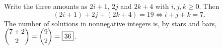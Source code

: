Write the three amounts as $2i+1$, $2j$ and $2k+4$ with $i,j,k\ge0$. Then
\[(2i+1)+2j+(2k+4)=19\iff i+j+k=7.\]
The number of solutions in nonnegative integers is, by stars and bars, $\dbinom{7+2}{2}=\dbinom92=\boxed{36}$.
